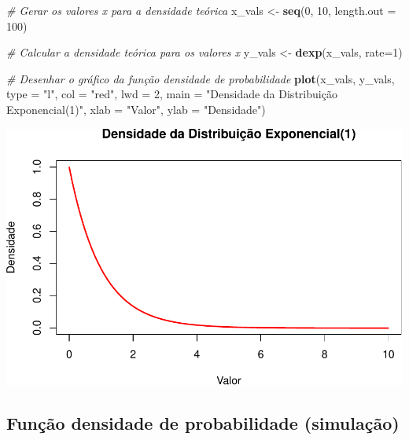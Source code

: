 \documentclass[
]{book}
\newenvironment{Shaded}{\begin{snugshade}}{\end{snugshade}}
\newcommand{\AttributeTok}[1]{\textcolor[rgb]{0.13,0.29,0.53}{#1}}
\newcommand{\CommentTok}[1]{\textcolor[rgb]{0.56,0.35,0.01}{\textit{#1}}}
\newcommand{\DecValTok}[1]{\textcolor[rgb]{0.00,0.00,0.81}{#1}}
\newcommand{\FunctionTok}[1]{\textcolor[rgb]{0.13,0.29,0.53}{\textbf{#1}}}
\newcommand{\NormalTok}[1]{#1}
\newcommand{\OtherTok}[1]{\textcolor[rgb]{0.56,0.35,0.01}{#1}}
\newcommand{\StringTok}[1]{\textcolor[rgb]{0.31,0.60,0.02}{#1}}
\begin{document}
\begin{Shaded}
\begin{Highlighting}[]
\CommentTok{\# Gerar os valores x para a densidade teórica}
\NormalTok{x\_vals }\OtherTok{\textless{}{-}} \FunctionTok{seq}\NormalTok{(}\DecValTok{0}\NormalTok{, }\DecValTok{10}\NormalTok{, }\AttributeTok{length.out =} \DecValTok{100}\NormalTok{)}

\CommentTok{\# Calcular a densidade teórica para os valores x}
\NormalTok{y\_vals }\OtherTok{\textless{}{-}} \FunctionTok{dexp}\NormalTok{(x\_vals, }\AttributeTok{rate=}\DecValTok{1}\NormalTok{)}

\CommentTok{\# Desenhar o gráfico da função densidade de probabilidade}
\FunctionTok{plot}\NormalTok{(x\_vals, y\_vals, }\AttributeTok{type =} \StringTok{"l"}\NormalTok{, }
     \AttributeTok{col =} \StringTok{"red"}\NormalTok{, }\AttributeTok{lwd =} \DecValTok{2}\NormalTok{, }
     \AttributeTok{main =} \StringTok{"Densidade da Distribuição Exponencial(1)"}\NormalTok{,}
     \AttributeTok{xlab =} \StringTok{"Valor"}\NormalTok{, }\AttributeTok{ylab =} \StringTok{"Densidade"}\NormalTok{)}
\end{Highlighting}
\end{Shaded}

\includegraphics{introR_files/figure-latex/unnamed-chunk-274-1.pdf}

\subsection{Função densidade de probabilidade (simulação)}\label{funuxe7uxe3o-densidade-de-probabilidade-simulauxe7uxe3o-1}
\end{document}

